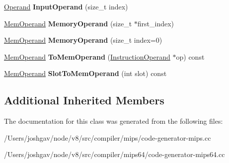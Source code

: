\begin{DoxyCompactItemize}
\item 
\hyperlink{classv8_1_1internal_1_1_operand}{Operand} {\bfseries Input\+Operand} (size\+\_\+t index)\hypertarget{classv8_1_1internal_1_1compiler_1_1_mips_operand_converter_ac5b7d176d4584ecd2f83f3420ec28fe2}{}\label{classv8_1_1internal_1_1compiler_1_1_mips_operand_converter_ac5b7d176d4584ecd2f83f3420ec28fe2}

\item 
\hyperlink{classv8_1_1internal_1_1_mem_operand}{Mem\+Operand} {\bfseries Memory\+Operand} (size\+\_\+t $\ast$first\+\_\+index)\hypertarget{classv8_1_1internal_1_1compiler_1_1_mips_operand_converter_aa983e5948cbb47a54f6c1fdfa7492d9f}{}\label{classv8_1_1internal_1_1compiler_1_1_mips_operand_converter_aa983e5948cbb47a54f6c1fdfa7492d9f}

\item 
\hyperlink{classv8_1_1internal_1_1_mem_operand}{Mem\+Operand} {\bfseries Memory\+Operand} (size\+\_\+t index=0)\hypertarget{classv8_1_1internal_1_1compiler_1_1_mips_operand_converter_acbbfede51be99cbac1a7d4ba4b0f5a83}{}\label{classv8_1_1internal_1_1compiler_1_1_mips_operand_converter_acbbfede51be99cbac1a7d4ba4b0f5a83}

\item 
\hyperlink{classv8_1_1internal_1_1_mem_operand}{Mem\+Operand} {\bfseries To\+Mem\+Operand} (\hyperlink{classv8_1_1internal_1_1compiler_1_1_instruction_operand}{Instruction\+Operand} $\ast$op) const \hypertarget{classv8_1_1internal_1_1compiler_1_1_mips_operand_converter_a40eb04c793042060efec8065d592d857}{}\label{classv8_1_1internal_1_1compiler_1_1_mips_operand_converter_a40eb04c793042060efec8065d592d857}

\item 
\hyperlink{classv8_1_1internal_1_1_mem_operand}{Mem\+Operand} {\bfseries Slot\+To\+Mem\+Operand} (int slot) const \hypertarget{classv8_1_1internal_1_1compiler_1_1_mips_operand_converter_acd0655b42588c010951596323e091c6d}{}\label{classv8_1_1internal_1_1compiler_1_1_mips_operand_converter_acd0655b42588c010951596323e091c6d}

\end{DoxyCompactItemize}
\subsection*{Additional Inherited Members}


The documentation for this class was generated from the following files\+:\begin{DoxyCompactItemize}
\item 
/\+Users/joshgav/node/v8/src/compiler/mips/code-\/generator-\/mips.\+cc\item 
/\+Users/joshgav/node/v8/src/compiler/mips64/code-\/generator-\/mips64.\+cc\end{DoxyCompactItemize}
